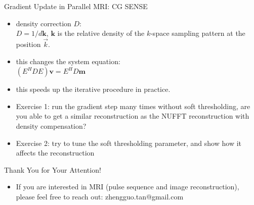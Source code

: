 \begin{frame}{Gradient Update in Parallel MRI: CG SENSE}

	\begin{itemize}
		\item density correction $D$:\\
		$D = 1 / d \mathbf{k}$, $\mathbf{k}$ is the relative density of the $k$-space sampling pattern at the position $\vec{k}$.
		\vspace{2em}
		\item this changes the system equation:\\
		$(E^H D E) \mathbf{v} = E^H D \mathbf{m}$
		\vspace{2em}
		\item <2-> this speeds up the iterative procedure in practice.
		\vspace{1em}
		\item <3-> Exercise 1: run the gradient step many times without soft thresholding, are you able to get a similar reconstruction as the NUFFT reconstruction with density compensation?
		\vspace{1em}
		\item <4-> Exercise 2: try to tune the soft thresholding parameter, and show how it affects the reconstruction

	\end{itemize}

\end{frame}




\begin{frame}{Thank You for Your Attention!}
    \begin{itemize}
        \item If you are interested in MRI (pulse sequence and image reconstruction), please feel free to reach out: zhengguo.tan@gmail.com
    \end{itemize}
\end{frame}